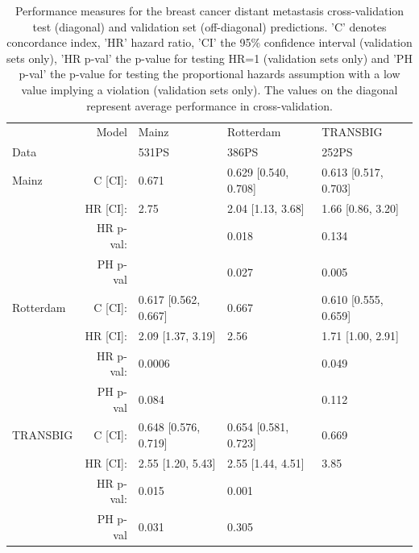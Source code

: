 \documentclass[letterpaper,12pt]{article}
\begin{document}

\begin{table}[h]
\centering
\caption{Performance measures for the breast cancer distant metastasis cross-validation test (diagonal) and validation set (off-diagonal) predictions. 'C' denotes concordance index, 'HR' hazard ratio, 'CI' the 95\% confidence interval (validation sets only), 'HR p-val' the p-value for testing HR=1 (validation sets only) and 'PH p-val' the p-value for testing the proportional hazards assumption with a low value implying a violation (validation sets only). The values on the diagonal represent average performance in cross-validation.}
\label{Table:HRTable2}
\begin{small}
    \begin{tabular}{ | l r | l | l | l |} 
    \hline
     & Model & Mainz & Rotterdam & TRANSBIG \\ Data & & 531PS & 386PS & 252PS \\\hline \hline
    Mainz & C [CI]:& 0.671& 0.629 [0.540, 0.708]& 0.613 [0.517, 0.703]\\ &HR [CI]:& 2.75 & 2.04 [1.13, 3.68]&1.66 [0.86, 3.20]\\ &HR p-val:& & 0.018&0.134\\ &PH p-val& & 0.027& 0.005\\\hline
		Rotterdam  & C [CI]:& 0.617 [0.562, 0.667]& 0.667& 0.610 [0.555, 0.659]\\ &HR [CI]:& 2.09 [1.37, 3.19]& 2.56 &1.71 [1.00, 2.91]\\ &HR p-val:& 0.0006&&0.049\\ &PH p-val& 0.084& & 0.112\\\hline
		TRANSBIG  & C [CI]:& 0.648 [0.576, 0.719]& 0.654 [0.581, 0.723]& 0.669\\ &HR [CI]:& 2.55 [1.20, 5.43]& 2.55 [1.44, 4.51]& 3.85\\ &HR p-val:& 0.015& 0.001&\\ &PH p-val& 0.031& 0.305 &\\\hline
    \end{tabular}
\end{small}
\end{table}
\end{document}
